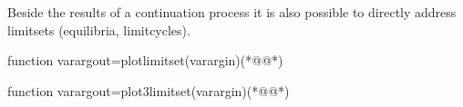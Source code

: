 Beside the results of a continuation process it is also possible to directly address limitsets (equilibria, limitcycles).
\begin{matlab}
function varargout=plotlimitset(varargin)(*@@*)
%
%
%
% 
%
%
%
%
\end{matlab}
\begin{matlab}
function varargout=plot3limitset(varargin)(*@@*)
%
%
%
% 
%
%
%
%
\end{matlab}
